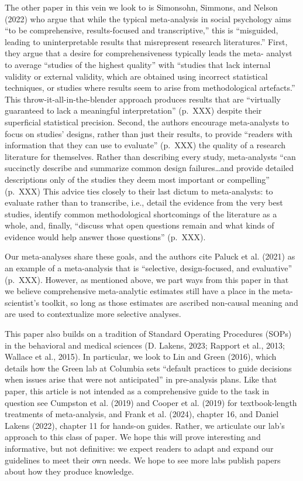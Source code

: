 \documentclass[
  man]{apa6}
\begin{document}
The other paper in this vein we look to is Simonsohn, Simmons, and Nelson (2022) who argue that while the typical meta-analysis in social psychology aims ``to be comprehensive, results-focused and transcriptive,'' this is ``misguided, leading to uninterpretable results that misrepresent research literatures.'' First, they argue that a desire for comprehensiveness typically leads the meta- analyst to average ``studies of the highest quality'' with ``studies that lack internal validity or external validity, which are obtained using incorrect statistical techniques, or studies where results seem to arise from methodological artefacts.'' This throw-it-all-in-the-blender approach produces results that are ``virtually guaranteed to lack a meaningful interpretation'' (p.~XXX) despite their superficial statistical precision. Second, the authors encourage meta-analysts to focus on studies' designs, rather than just their results, to provide ``readers with information that they can use to evaluate'' (p.~XXX) the quality of a research literature for themselves. Rather than describing every study, meta-analysts ``can succinctly describe and summarize common design failures\ldots and provide detailed descriptions only of the studies they deem most important or compelling'' (p.~XXX) This advice ties closely to their last dictum to meta-analysts: to evaluate rather than to transcribe, i.e., detail the evidence from the very best studies, identify common methodological shortcomings of the literature as a whole, and, finally, ``discuss what open questions remain and what kinds of evidence would help answer those questions'' (p.~XXX).

Our meta-analyses share these goals, and the authors cite Paluck et al. (2021) as an example of a meta-analysis that is ``selective, design-focused, and evaluative'' (p.~XXX). However, as mentioned above, we part ways from this paper in that we believe comprehensive meta-analytic estimates still have a place in the meta-scientist's toolkit, so long as those estimates are ascribed non-causal meaning and are used to contextualize more selective analyses.

This paper also builds on a tradition of Standard Operating Procedures (SOPs) in the behavioral and medical sciences (D. Lakens, 2023; Rapport et al., 2013; Wallace et al., 2015). In particular, we look to Lin and Green (2016), which details how the Green lab at Columbia sets ``default practices to guide decisions when issues arise that were not anticipated'' in pre-analysis plans. Like that paper, this article is not intended as a comprehensive guide to the task in question \textemdash see Cumpston et al. (2019) and Cooper et al. (2019) for textbook-length treatments of meta-analysis, and Frank et al. (2024), chapter 16, and Daniel Lakens (2022), chapter 11 for hands-on guides. Rather, we articulate our lab's approach to this class of paper. We hope this will prove interesting and informative, but not definitive: we expect readers to adapt and expand our guidelines to meet their own needs. We hope to see more labs publish papers about how they produce knowledge.
\end{document}
